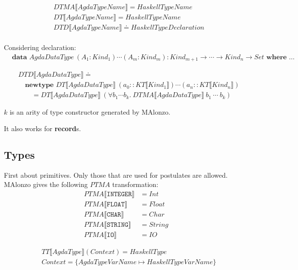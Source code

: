 \begin{align*}
   &DTMA\llbracket AgdaTypeName \rrbracket = HaskellTypeName\\
   &DT\llbracket AgdaTypeName \rrbracket = HaskellTypeName\\
   &DTD\llbracket AgdaTypeName \rrbracket \doteq HaskellTypeDeclaration\\
\end{align*}

Considering declaration:
\begin{align*}
   &\textbf{data } AgdaDataType\ (A_1 : Kind_1) \cdots (A_m : Kind_m) :
      Kind_{m+1} \rightarrow \cdots \rightarrow Kind_n \rightarrow Set \textbf{ where } \ldots
\end{align*}

\begin{align*}
   &DTD\llbracket AgdaDataType \rrbracket \doteq\\
   &\quad\textbf{newtype } DT\llbracket AgdaDataType \rrbracket\ (a_0 :: KT\llbracket Kind_1 \rrbracket)
      \cdots (a_n :: KT\llbracket Kind_n \rrbracket)\\
   &\quad\quad = DT\llbracket AgdaDataType \rrbracket\ (\forall b_1 \cdots b_k.\ DTMA\llbracket AgdaDataType \rrbracket\ b_1\ \cdots\ b_k)
\end{align*}

\(k\) is an arity of type constructor generated by MAlonzo.

It also works for \textbf{record}s.

\subsection{Types}

First about primitives. Only those that are used for postulates are allowed.
MAlonzo gives the following \(PTMA\) transformation:
\begin{align*}
   PTMA\llbracket \texttt{INTEGER} \rrbracket &= Int\\
   PTMA\llbracket \texttt{FLOAT} \rrbracket &= Float\\
   PTMA\llbracket \texttt{CHAR} \rrbracket &= Char\\
   PTMA\llbracket \texttt{STRING} \rrbracket &= String\\
   PTMA\llbracket \texttt{IO} \rrbracket &= IO
\end{align*}

\begin{align*}
   &TT\llbracket AgdaType \rrbracket(Context) = HaskellType\\
   &Context = \{ AgdaTypeVarName \mapsto HaskellTypeVarName \}
\end{align*}

